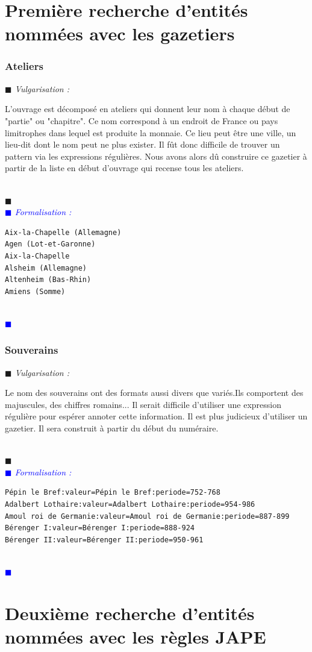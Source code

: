 \documentclass[a4paper, 11pt]{report}
\newenvironment{vulgarisation}
    {
    \textit{\textcolor{dark-blue}{$\blacksquare$  Vulgarisation : \\}}

    }
    {
    ~\\\textcolor{dark-blue}{$\blacksquare$}\\
    }
\newenvironment{formalisation}
    {
    \textit{\textcolor{blue}{$\blacksquare$  Formalisation : \\}}
    }
    {
    ~\\\textcolor{blue}{$\blacksquare$}\\
    }
\begin{document}
    
	\section{Première recherche d'entités nommées avec les gazetiers}
	\subsubsection{Ateliers}
\begin{vulgarisation}
	L'ouvrage est décomposé en ateliers qui donnent leur nom à chaque début de "partie" ou "chapitre". Ce nom correspond à un endroit de France ou pays limitrophes dans lequel est produite la monnaie. Ce lieu peut être une ville, un lieu-dit dont le nom peut ne plus exister. Il fût donc difficile de trouver un pattern via les expressions régulières. Nous avons alors dû construire ce gazetier à partir de la liste en début d'ouvrage qui recense tous les ateliers.
\end{vulgarisation}
\begin{formalisation}
\begin{verbatim}
Aix-la-Chapelle (Allemagne)
Agen (Lot-et-Garonne)
Aix-la-Chapelle
Alsheim (Allemagne)
Altenheim (Bas-Rhin)
Amiens (Somme)
\end{verbatim}
\end{formalisation}

\subsubsection{Souverains}
\begin{vulgarisation}
	Le nom des souverains ont des formats aussi divers que variés.Ils comportent des majuscules, des chiffres romains... Il serait difficile d'utiliser une expression régulière pour espérer annoter cette information. Il est plus judicieux d'utiliser un gazetier. Il sera construit à partir du début du numéraire. 
\end{vulgarisation}
\begin{formalisation}
\begin{verbatim}
Pépin le Bref:valeur=Pépin le Bref:periode=752-768
Adalbert Lothaire:valeur=Adalbert Lothaire:periode=954-986
Amoul roi de Germanie:valeur=Amoul roi de Germanie:periode=887-899
Bérenger I:valeur=Bérenger I:periode=888-924
Bérenger II:valeur=Bérenger II:periode=950-961
\end{verbatim}
\end{formalisation}

	\section{Deuxième recherche d'entités nommées avec les règles JAPE}
\end{document}
